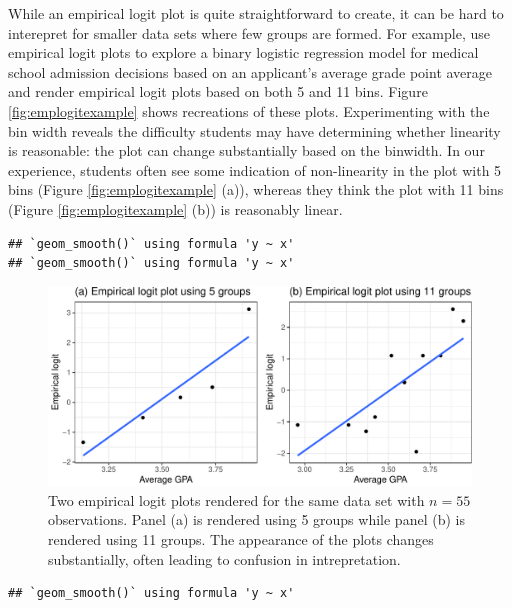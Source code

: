 \documentclass[12pt]{article}
\begin{document}
While an empirical logit plot is quite straightforward to create, it can
be hard to interepret for smaller data sets where few groups are formed.
For example, \citet{stat2} use empirical logit plots to explore a binary
logistic regression model for medical school admission decisions based
on an applicant's average grade point average and render empirical logit
plots based on both 5 and 11 bins. Figure \ref{fig:emplogitexample}
shows recreations of these plots. Experimenting with the bin width
reveals the difficulty students may have determining whether linearity
is reasonable: the plot can change substantially based on the binwidth.
In our experience, students often see some indication of non-linearity
in the plot with 5 bins (Figure \ref{fig:emplogitexample} (a)), whereas
they think the plot with 11 bins (Figure \ref{fig:emplogitexample} (b))
is reasonably linear.

\begin{verbatim}
## `geom_smooth()` using formula 'y ~ x'
## `geom_smooth()` using formula 'y ~ x'
\end{verbatim}

\begin{figure}

{\centering \includegraphics[width=0.85\linewidth]{vizinf-paper_files/figure-latex/unnamed-chunk-7-1} 

}

\caption{\label{fig:emplogitexample} Two empirical logit plots rendered for the same data set with $n=55$ observations. Panel (a) is rendered using 5 groups while panel (b) is rendered using 11 groups. The appearance of the plots changes substantially, often leading to confusion in intrepretation.}\label{fig:unnamed-chunk-7}
\end{figure}

\begin{verbatim}
## `geom_smooth()` using formula 'y ~ x'
\end{verbatim}
\end{document}
